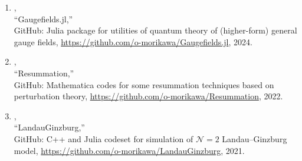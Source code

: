 \begin{enumerate}
\begin{enumerate}
       \end{enumerate}
 \item \OM,\\
       ``Gaugefields.jl,''\\
       GitHub:
       Julia package for utilities of quantum theory of (higher-form) general gauge fields,
       \url{https://github.com/o-morikawa/Gaugefields.jl}, 2024.
 \item \OM,\\
       ``Resummation,''\\
       GitHub:
       Mathematica codes for some resummation techniques based on perturbation theory,
       \url{https://github.com/o-morikawa/Resummation}, 2022.
 \item \OM,\\
       ``LandauGinzburg,''\\
       GitHub:
       C++ and Julia codeset for simulation of $\mathcal{N}=2$ Landau--Ginzburg model,
       \url{https://github.com/o-morikawa/LandauGinzburg}, 2021.
\end{enumerate}

\renewcommand{\labelenumi}{\arabic{enumi}.}
